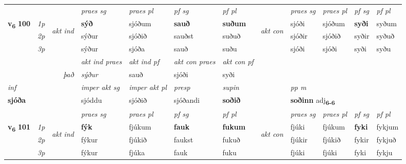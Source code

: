 \begin{longtable}[l]{X>{\footnotesize\itshape}llXXXXlXXXX}
 & &   & \textit{praes sg}  & \textit{praes pl}    & \textit{ pf sg} & \textit{pf pl} & & \textit{praes sg}  & \textit{praes pl}    & \textit{pf sg} & \textit{pf pl }  \\ \cmidrule{4-7} \cmidrule{9-12}
 \multirow{2}{*}{{{\textbf{v{\textsubscript{6}}} \Large{\textbf{100}}}}}  & 1p & \multirow{3}{*}{\begin{turn}{90}\textit{akt ind}\end{turn}} & \textbf{sýð} & sjóðum & \textbf{sauð} & \textbf{suðum} & \multirow{3}{*}{\begin{turn}{90}\textit{akt con}\end{turn}} &sjóði & sjóðum & \textbf{syði} & syðum\\*
 & 2p &  &  sýður  & sjóðið & sauðst & suðuð & & sjóðir & sjóðið & syðir & syðuð \\*
 & 3p &  & sýður & sjóða & sauð & suðu & & sjóði & sjóði& syði & syðu \\*
\cmidrule{4-7} \cmidrule{9-12}

   && &  \textit{akt ind praes} & \textit{akt ind pf} & \textit{akt con praes} & \textit{akt con pf} \\*
\multicolumn{3}{r}{\textit{það}} & sýður & sauð & sjóði & syði \\*

\cmidrule{4-7}
   {\textit{inf}} & &  & \textit{imper akt sg} & \textit{imper akt pl}   & \textit{presp} & \textit{supin}  && \textit{pp m} \\*
  {\textbf{sjóða}} & && sjóddu  & sjóðið   & sjóðandi &  \textbf{soðið}  && \multicolumn{2}{l}{\textbf{soðinn} adj\textbf{\textsubscript{6-6}}} \\*

\midrule

 & &   & \textit{praes sg}  & \textit{praes pl}    & \textit{ pf sg} & \textit{pf pl} & & \textit{praes sg}  & \textit{praes pl}    & \textit{pf sg} & \textit{pf pl }  \\ \cmidrule{4-7} \cmidrule{9-12}
 \multirow{2}{*}{{{\textbf{v{\textsubscript{6}}} \Large{\textbf{101}}}}}  & 1p & \multirow{3}{*}{\begin{turn}{90}\textit{akt ind}\end{turn}} & \textbf{fýk} & fjúkum & \textbf{fauk} & \textbf{fukum} & \multirow{3}{*}{\begin{turn}{90}\textit{akt con}\end{turn}} &fjúki & fjúkum & \textbf{fyki} & fykjum\\*
 & 2p &  &  fýkur  & fjúkið & faukst & fukuð & & fjúkir & fjúkið & fykir & fykjuð \\*
 & 3p &  & fýkur & fjúka & fauk & fuku & & fjúki & fjúki& fyki & fykju \\*
\cmidrule{4-7} \cmidrule{9-12}


\end{longtable}

